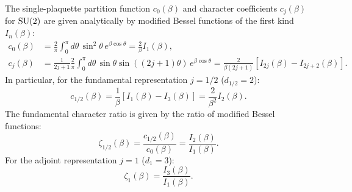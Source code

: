 \begin{proposition}
\label{prop:su2_bessel}
The single-plaquette partition function $c_0(\beta)$ and character coefficients $c_j(\beta)$ for $\mathrm{SU}(2)$ are given analytically by modified Bessel functions of the first kind $I_n(\beta)$:
\begin{align}
c_0(\beta) &= \frac{2}{\pi} \int_0^\pi d\theta \, \sin^2\theta \, e^{\beta \cos\theta} = \frac{2}{\beta} I_1(\beta), \label{eq:c0_su2} \\
c_j(\beta) &= \frac{1}{2j+1} \frac{2}{\pi} \int_0^\pi d\theta \, \sin\theta \sin((2j+1)\theta) \, e^{\beta \cos\theta} = \frac{2}{\beta (2j+1)} \left[ I_{2j}(\beta) - I_{2j+2}(\beta) \right]. \label{eq:cj_su2}
\end{align}
In particular, for the fundamental representation $j = 1/2$ ($d_{1/2} = 2$):
\begin{equation}
\label{eq:c_half_su2}
c_{1/2}(\beta) = \frac{1}{\beta} \left[ I_1(\beta) - I_3(\beta) \right] = \frac{2}{\beta^2} I_2(\beta).
\end{equation}
The fundamental character ratio is given by the ratio of modified Bessel functions:
\begin{equation}
\label{eq:zeta_half_su2}
\zeta_{1/2}(\beta) = \frac{c_{1/2}(\beta)}{c_0(\beta)} = \frac{I_2(\beta)}{I_1(\beta)}.
\end{equation}
For the adjoint representation $j = 1$ ($d_1 = 3$):
\begin{equation}
\label{eq:zeta_adj_su2}
\zeta_1(\beta) = \frac{I_3(\beta)}{I_1(\beta)}.
\end{equation}
\end{proposition}

